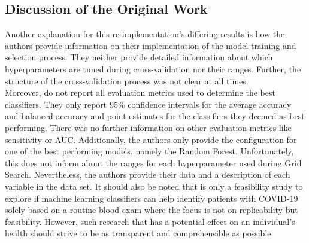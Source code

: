\subsection{Discussion of the Original Work}
Another explanation for this re-implementation's differing results is how 
the authors provide information on their implementation of the model 
training and selection process. They neither provide detailed 
information about which hyperparameters are tuned during cross-validation nor 
their ranges. Further, the structure of the cross-validation process was not 
clear at all times.
\\
Moreover, \citeauthor{RN127} do not report all evaluation metrics used to 
determine the best classifiers. They only report 95\% confidence intervals for 
the average accuracy and balanced accuracy and point estimates for the 
classifiers they deemed as best performing. There was no further information 
on other evaluation metrics like sensitivity or AUC. Additionally, the authors 
only provide the configuration for one of the best performing models, 
namely the Random Forest. Unfortunately, this does not inform about the ranges 
for each hyperparameter used during Grid Search.
Nevertheless, the authors provide their data and a description of each 
variable in the data set. It should also be noted that \cite{RN127} is only a 
feasibility study to explore if machine learning classifiers can help identify 
patients with COVID-19 solely based on a routine blood exam where the focus is 
not on replicability but feasibility. However, such research that has a 
potential effect on an individual's health should strive to be as transparent 
and comprehensible as possible.
